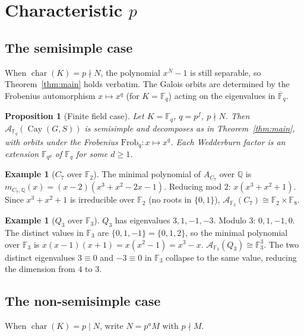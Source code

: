 \documentclass[12pt]{amsart}
\numberwithin{equation}{section}
\theoremstyle{plain}
\newtheorem{proposition}[theorem]{Proposition}
\theoremstyle{definition}
\newtheorem{example}[theorem]{Example}
\DeclareMathOperator{\ch}{char}
\DeclareMathOperator{\Cay}{Cay}
\newcommand{\Q}{\mathbb{Q}}
\newcommand{\F}{\mathbb{F}}
\newcommand{\calA}{\mathcal{A}}
\begin{document}
\section{Characteristic $p$}
\label{sec:charp}

\subsection{The semisimple case}

When $\ch(K) = p \nmid N$, the polynomial $x^N - 1$ is still separable,
so Theorem~\ref{thm:main} holds verbatim.  The Galois orbits are determined
by the Frobenius automorphism $x \mapsto x^q$ (for $K = \F_q$) acting on
the eigenvalues in $\overline{\F}_q$.

\begin{proposition}[Finite field case]
\label{prop:Fq}
Let $K = \F_q$, $q = p^f$, $p \nmid N$.  Then $\calA_{\F_q}(\Cay(G,S))$
is semisimple and decomposes as in Theorem~\ref{thm:main}, with orbits
under the Frobenius $\mathrm{Frob}_q : x \mapsto x^q$.  Each Wedderburn
factor is an extension $\F_{q^d}$ of $\F_q$ for some $d \ge 1$.
\end{proposition}

\begin{example}[$C_7$ over $\F_2$]
The minimal polynomial of $A_{C_7}$ over $\Q$ is
$m_{C_7,\Q}(x) = (x-2)(x^3+x^2-2x-1)$.  Reducing mod $2$:
$x(x^3+x^2+1)$.  Since $x^3+x^2+1$ is irreducible over $\F_2$
(no roots in $\{0,1\}$), $\calA_{\F_2}(C_7) \cong \F_2 \times \F_8$.
\end{example}

\begin{example}[$Q_3$ over $\F_3$]
$Q_3$ has eigenvalues $3, 1, -1, -3$.  Modulo $3$: $0, 1, -1, 0$.
The distinct values in $\F_3$ are $\{0, 1, -1\} = \{0, 1, 2\}$, so
the minimal polynomial over $\F_3$ is $x(x-1)(x+1) = x(x^2-1) = x^3-x$.
$\calA_{\F_3}(Q_3) \cong \F_3^3$.  The two distinct eigenvalues $3 \equiv 0$
and $-3 \equiv 0$ in $\F_3$ collapse to the same value, reducing the
dimension from $4$ to $3$.
\end{example}

\subsection{The non-semisimple case}

When $\ch(K) = p \mid N$, write $N = p^a M$ with $p \nmid M$.
\end{document}
